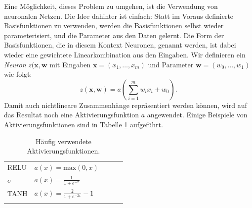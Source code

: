 Eine Möglichkeit, dieses Problem zu umgehen, ist die Verwendung von neuronalen Netzen.
Die Idee dahinter ist einfach: Statt im Voraus definierte Basisfunktionen zu verwenden, werden 
die Basisfunktionen selbst wieder parameterisiert, und die Parameter aus den Daten gelernt. 
Die Form der Basisfunktionen, die in diesem Kontext Neuronen, genannt werden, ist dabei wieder eine gewichtete 
Linearkombination aus den Eingaben.  Wir definieren  ein \emph{Neuron} $z(\textbf{x}, \textbf{w}$ mit Eingaben $\textbf{x} = (x_1, \ldots, x_m)$ und Parameter $\textbf{w} = (w_0, \ldots, w_1)$ wie folgt:
\[
   z(\textbf{x}, \textbf{w})=a(\sum_{i=1}^m w_{i}x_i + w_0).
\]
Damit auch nichtlineare Zusammenhänge repräsentiert werden können, wird auf das Resultat noch eine Aktivierungsfunktion $a$ angewendet. 
Einige Beispiele von Aktivierungsfunktionen sind in Tabelle \ref{ML:aktivierungsfunktionen} aufgeführt.

\begin{table}[h]
    \centering
    \begin{tabular}{lllll}
    \cline{1-2}
    \multicolumn{1}{|l|}{RELU}   & \multicolumn{1}{l|}{$a(x) = \mathrm{max}(0,x)$}              &  &  &  \\ \cline{1-2}
    \multicolumn{1}{|l|}{$\sigma$} & \multicolumn{1}{l|}{$a(x) = \frac{1}{1+e^{-x}}$}    &  &  &  \\ \cline{1-2}
    \multicolumn{1}{|l|}{TANH}   & \multicolumn{1}{l|}{$a(x) = \frac{2}{1+e^{-2x}}-1$} &  &  &  \\ \cline{1-2}
                                 &                                                   &  &  & 
    \end{tabular}
    \caption{Häufig verwendete Aktivierungsfunktionen.}
    \label{ML:aktivierungsfunktionen}
\end{table}

